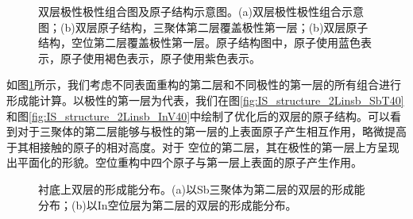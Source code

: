 \begin{figure}[htb]
\begin{minipage}[b]{0.5\textwidth}
{        }
    \end{minipage}
    \caption{双层极性极性组合图及原子结构示意图。(a)双层极性极性组合示意图；(b)双层原子结构，三聚体第二层覆盖极性第一层；(b)双层原子结构，空位第二层覆盖极性第一层。原子结构图中，原子使用蓝色表示，原子使用褐色表示，原子使用紫色表示。}
    \label{fig:IS_structure_2Linsb}
\end{figure}

如图\ref{fig:IS_structure_2Linsb}所示，我们考虑不同表面重构的第二层和不同极性的第一层的所有组合进行形成能计算。以极性的第一层为代表，我们在图\ref{fig:IS_structure_2Linsb_SbT40}和图\ref{fig:IS_structure_2Linsb_InV40}中绘制了优化后的双层的原子结构。可以看到对于三聚体的第二层能够与极性的第一层的上表面原子产生相互作用，略微提高于其相接触的原子的相对高度。对于 空位的第二层，其在极性的第一层上方呈现出平面化的形貌。空位重构中四个原子与第一层上表面的原子产生作用。

\begin{figure}[htb]
    \caption{衬底上双层的形成能分布。(a)以Sb三聚体为第二层的双层的形成能分布；(b)以In空位层为第二层的双层的形成能分布。}
    \label{fig:IS_DFT_2LInSb_formationEnergy}
\end{figure}

